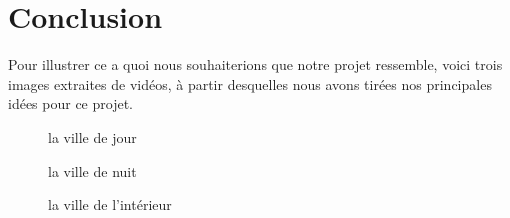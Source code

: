\documentclass[a4paper,12pt]{article}
\begin{document}
\section*{Conclusion}

Pour illustrer ce a quoi nous souhaiterions que notre projet ressemble, voici trois images extraites de vidéos, à partir desquelles nous avons tirées nos principales idées pour ce projet.
\begin{figure}[h!]
  \centering

  \caption{la ville de jour}
  \label{fig:villes1}
\end{figure}
\begin{figure}[h!]
  \centering

  \caption{la ville de nuit}
  \label{fig:villes2}
\end{figure}
\begin{figure}[h!]
  \centering

  \caption{la ville de l'intérieur}
  \label{fig:villes3}
\end{figure}

\end{document}
